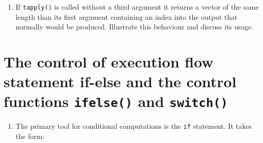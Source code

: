 \documentclass[
]{book}
\newenvironment{Shaded}{\begin{snugshade}}{\end{snugshade}}
\newcommand{\AttributeTok}[1]{\textcolor[rgb]{0.13,0.29,0.53}{#1}}
\newcommand{\CommentTok}[1]{\textcolor[rgb]{0.56,0.35,0.01}{\textit{#1}}}
\newcommand{\ControlFlowTok}[1]{\textcolor[rgb]{0.13,0.29,0.53}{\textbf{#1}}}
\newcommand{\DecValTok}[1]{\textcolor[rgb]{0.00,0.00,0.81}{#1}}
\newcommand{\FloatTok}[1]{\textcolor[rgb]{0.00,0.00,0.81}{#1}}
\newcommand{\FunctionTok}[1]{\textcolor[rgb]{0.13,0.29,0.53}{\textbf{#1}}}
\newcommand{\NormalTok}[1]{#1}
\newcommand{\OtherTok}[1]{\textcolor[rgb]{0.56,0.35,0.01}{#1}}
\newcommand{\SpecialCharTok}[1]{\textcolor[rgb]{0.81,0.36,0.00}{\textbf{#1}}}
\newcommand{\StringTok}[1]{\textcolor[rgb]{0.31,0.60,0.02}{#1}}
\providecommand{\tightlist}{%
  \setlength{\itemsep}{0pt}\setlength{\parskip}{0pt}}
\begin{document}
\begin{Shaded}
\end{Shaded}

\begin{enumerate}
\def\labelenumi{(\alph{enumi})}
\setcounter{enumi}{4}
\tightlist
\item
  If \texttt{tapply()} is called without a third argument it returns a vector of the same length than its first argument containing an index into the output that normally would be produced. Illustrate this behaviour and discuss its usage.
\end{enumerate}

\section{\texorpdfstring{The control of execution flow statement if-else and the control functions \texttt{ifelse()} and \texttt{switch()}}{The control of execution flow statement if-else and the control functions ifelse() and switch()}}\label{the-control-of-execution-flow-statement-if-else-and-the-control-functions-ifelse-and-switch}

\begin{enumerate}
\def\labelenumi{(\alph{enumi})}
\tightlist
\item
  The primary tool for conditional computations is the \texttt{if} statement. It takes the form:
\end{enumerate}
\end{document}
